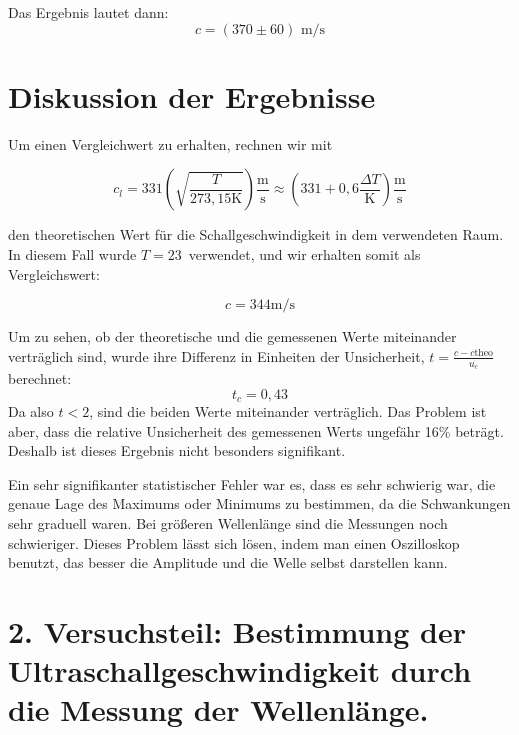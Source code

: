 \documentclass[11pt,a4paper]{article}
\begin{document}
Das Ergebnis lautet dann:
$$ c= (370 \pm 60) \textrm{ m/s}$$








\section{Diskussion der Ergebnisse}

Um einen Vergleichwert zu erhalten, rechnen wir mit

\[
c_l=331\left(\sqrt{\frac{T}{273,15\mathrm{K}}}\right)\frac{\mathrm{m}}{\mathrm{s}}\approx\left(331+0,6\frac{\Delta T}{\mathrm{K}}\right)\mathrm{\frac{m}{s}}
\]

den theoretischen Wert f\"ur die Schallgeschwindigkeit in dem verwendeten Raum. In diesem Fall wurde $T=23$\celsius\ verwendet, und wir erhalten somit als Vergleichswert:

\[
c = 344 \textrm{m/s}
\]

Um zu sehen, ob der theoretische und die gemessenen Werte miteinander verträglich sind, wurde ihre Differenz in Einheiten der Unsicherheit, $t = \frac{c-c\textrm{theo}}{u_c}$ berechnet: 
$$t_c = 0,43$$
Da also $t<2$, sind die beiden Werte miteinander verträglich. Das Problem ist aber, dass die relative Unsicherheit des gemessenen Werts ungefähr 16\% beträgt. Deshalb ist dieses Ergebnis nicht besonders signifikant.

Ein sehr signifikanter statistischer Fehler war es, dass es sehr schwierig war, die genaue Lage des Maximums oder Minimums zu bestimmen, da die Schwankungen sehr graduell waren. Bei größeren Wellenlänge sind die Messungen noch schwieriger. Dieses Problem lässt sich lösen, indem man einen Oszilloskop benutzt, das besser die Amplitude und die Welle selbst darstellen kann. 

\pagebreak

\section{2. Versuchsteil: Bestimmung der Ultraschallgeschwindigkeit durch die Messung der Wellenlänge.}
\end{document}
